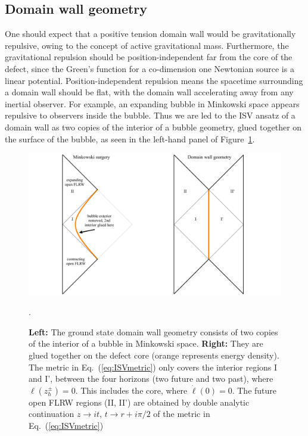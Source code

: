 \documentclass[aps,amsfonts,amsmath,prd,preprint,nofootinbib]{revtex4}
\begin{document}
\begin{appendix}
\subsection{Domain wall geometry}
One should expect that a positive tension domain wall would be gravitationally repulsive, owing to the concept of active gravitational mass.  Furthermore, 
the gravitational repulsion should be position-independent far from the core of the defect, since the Green's function for a co-dimension one Newtonian
source is a linear potential.  Position-independent repulsion means the spacetime surrounding a domain wall should be flat, with the domain wall accelerating away from any inertial observer.  
For example, an expanding bubble in Minkowski space appears repulsive to observers inside the bubble.  Thus we are led to the ISV ansatz
of a domain wall as two copies of the interior of a bubble geometry, glued together on the surface of the bubble, as seen in the left-hand panel of Figure~\ref{fig:ISV}.
\begin{figure}[htbp]
\begin{center}
\includegraphics[width=1\textwidth]{figures/ISVbubble}
\caption{{\bf Left:} The ground state domain wall geometry consists of two copies of the interior of a bubble in Minkowski space.    {\bf Right:} They are glued together on the defect core (orange represents energy density). 
The metric in Eq.~(\ref{eq:ISVmetric}) only covers the interior regions I and I', between the four horizons (two future and two past), where $\ell(z_h^\pm) = 0$.  This includes the core, where $\dot\ell(0) = 0$. The future open FLRW regions (II, II') are obtained by
double analytic continuation $z\to i t$, $t \to r + i\pi/2$ of the metric in Eq.~(\ref{eq:ISVmetric})}.
\label{fig:ISV}
\end{center}
\end{figure}



\end{appendix}
\end{document}
